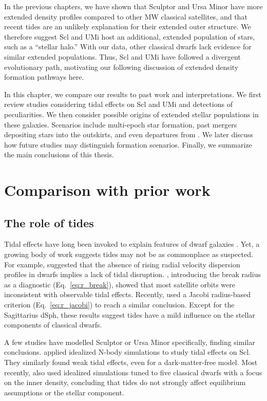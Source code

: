In the previous chapters, we have shown that Sculptor and Ursa Minor
have more extended density profiles compared to other MW classical
satellites, and that recent tides are an unlikely explanation for their
extended outer structure. We therefore suggest Scl and UMi host an
additional, extended population of stars, such as a ``stellar halo.''
With our data, other classical dwarfs lack evidence for similar extended
populations. Thus, Scl and UMi have followed a divergent evolutionary
path, motivating our following discussion of extended density formation
pathways here.

In this chapter, we compare our results to past work and
interpretations. We first review studies considering tidal effects on
Scl and UMi and detections of peculiarities. We then consider possible
origins of extended stellar populations in these galaxies. Scenarios
include multi-epoch star formation, past mergers depositing stars into
the outskirts, and even departures from \LCDM{}. We later discuss how
future studies may distinguish formation scenarios. Finally, we
summarize the main conclusions of this thesis.

\section{Comparison with prior work}\label{comparison-with-prior-work}

\subsection{The role of tides}\label{the-role-of-tides}

Tidal effects have long been invoked to explain features of dwarf
galaxies \citep[e.g.,
Section~\ref{sec:scl_umi_obs_tides},][]{mayer+2001a, tsujimoto+shigeyama2002}.
Yet, a growing body of work suggests tides may not be as commonplace as
suspected. For example, \citet{read+2006} suggested that the absence of
rising radial velocity dispersion profiles in dwarfs implies a lack of
tidal disruption. \citet{penarrubia+2009}, introducing the break radius
as a diagnostic (Eq.~\ref{eq:r_break}), showed that most satellite
orbits were inconsistent with observable tidal effects. Recently,
\citet{pace+erkal+li2022} used a Jacobi radius-based criterion
(Eq.~\ref{eq:r_jacobi}) to reach a similar conclusion. Except for the
Sagittarius dSph, these results suggest tides have a mild influence on
the stellar components of classical dwarfs.

A few studies have modelled Sculptor or Ursa Minor specifically, finding
similar conclusions. \citet{iorio+2019} applied idealized N-body
simulations to study tidal effects on Scl. They similarly found weak
tidal effects, even for a dark-matter-free model. Most recently,
\citet{tchiorniy+genina2025} also used idealized simulations tuned to
five classical dwarfs with a focus on the inner density, concluding that
tides do not strongly affect equilibrium assumptions or the stellar
component.

